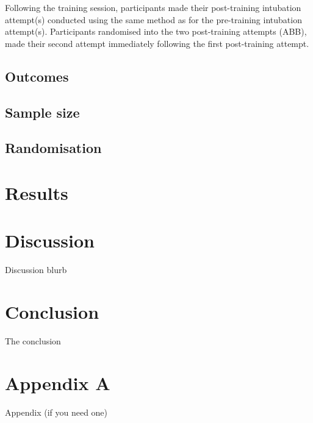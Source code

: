 \documentclass[]{article}
\begin{document}
Following the training session, participants made their post-training
intubation attempt(s) conducted using the same method as for the
pre-training intubation attempt(s). Participants randomised into the two
post-training attempts (ABB), made their second attempt immediately
following the first post-training attempt.

\hypertarget{outcomes}{%
\subsection{Outcomes}\label{outcomes}}

\hypertarget{sample-size}{%
\subsection{Sample size}\label{sample-size}}

\hypertarget{randomisation-1}{%
\subsection{Randomisation}\label{randomisation-1}}

\hypertarget{results-1}{%
\section{Results}\label{results-1}}

\hypertarget{discussion}{%
\section{Discussion}\label{discussion}}

Discussion blurb

\hypertarget{conclusion-1}{%
\section{Conclusion}\label{conclusion-1}}

The conclusion

\hypertarget{appendix-a}{%
\section{Appendix A}\label{appendix-a}}

Appendix (if you need one)


\end{document}
